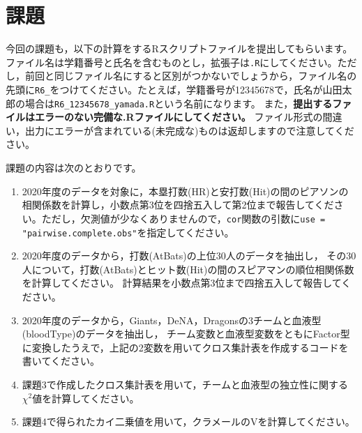 \documentclass{ltjsbook}
\begin{document}
\section{課題}
今回の課題も，以下の計算をするRスクリプトファイルを提出してもらいます。
ファイル名は学籍番号と氏名を含むものとし，拡張子は\verb|.R|にしてください。ただし，前回と同じファイル名にすると区別がつかないでしょうから，ファイル名の先頭に\verb|R6_|をつけてください。たとえば，学籍番号が12345678で，氏名が山田太郎の場合は\verb|R6_12345678_yamada.R|という名前になります。
また，\textbf{提出するファイルはエラーのない完備な.Rファイルにしてください。}
ファイル形式の間違い，出力にエラーが含まれている(未完成な)ものは返却しますので注意してください。

課題の内容は次のとおりです。
\begin{enumerate}
\item 2020年度のデータを対象に，本塁打数(HR)と安打数(Hit)の間のピアソンの相関係数を計算し，小数点第3位を四捨五入して第2位まで報告してください。ただし，欠測値が少なくありませんので，\verb|cor|関数の引数に\verb|use = "pairwise.complete.obs"|を指定してください。
\item 2020年度のデータから，打数(AtBats)の上位30人のデータを抽出し，
  その30人について，打数(AtBats)とヒット数(Hit)の間のスピアマンの順位相関係数を計算してください。
  計算結果を小数点第3位まで四捨五入して報告してください。
\item 2020年度のデータから，Giants，DeNA，Dragonsの3チームと血液型(bloodType)のデータを抽出し，
チーム変数と血液型変数をともにFactor型に変換したうえで，上記の2変数を用いてクロス集計表を作成するコードを書いてください。
\item 課題3で作成したクロス集計表を用いて，チームと血液型の独立性に関する$\chi^2$値を計算してください。
\item 課題4で得られたカイ二乗値を用いて，クラメールのVを計算してください。
\end{enumerate}
\end{document}

